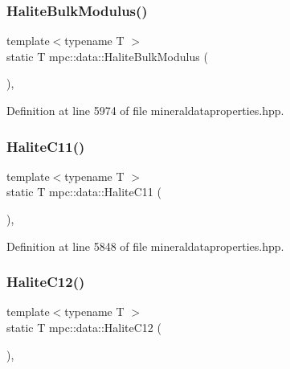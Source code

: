 \subsubsection{\texorpdfstring{Halite\+Bulk\+Modulus()}{HaliteBulkModulus()}}
{\footnotesize\ttfamily template$<$typename T $>$ \\
static T mpc\+::data\+::\+Halite\+Bulk\+Modulus (\begin{DoxyParamCaption}{ }\end{DoxyParamCaption})\hspace{0.3cm}{\ttfamily [inline]}, {\ttfamily [static]}}



Definition at line 5974 of file mineraldataproperties.\+hpp.

\mbox{\label{namespacempc_1_1data_ae66ad610c3fb2d0d0d948ca491f5ac8b}} 
\subsubsection{\texorpdfstring{Halite\+C11()}{HaliteC11()}}
{\footnotesize\ttfamily template$<$typename T $>$ \\
static T mpc\+::data\+::\+Halite\+C11 (\begin{DoxyParamCaption}{ }\end{DoxyParamCaption})\hspace{0.3cm}{\ttfamily [inline]}, {\ttfamily [static]}}



Definition at line 5848 of file mineraldataproperties.\+hpp.

\mbox{\label{namespacempc_1_1data_a5456d5bd2f802f924af06e711e7e13e3}} 
\subsubsection{\texorpdfstring{Halite\+C12()}{HaliteC12()}}
{\footnotesize\ttfamily template$<$typename T $>$ \\
static T mpc\+::data\+::\+Halite\+C12 (\begin{DoxyParamCaption}{ }\end{DoxyParamCaption})\hspace{0.3cm}{\ttfamily [inline]}, {\ttfamily [static]}}



